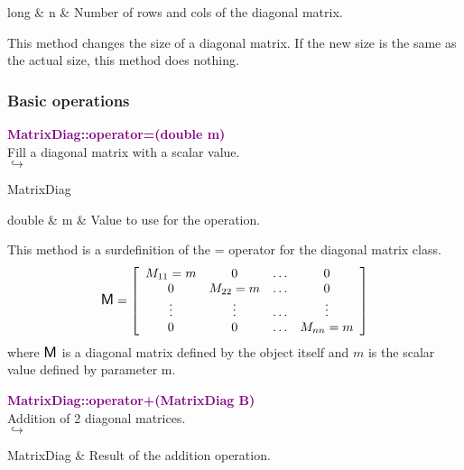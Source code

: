 \begin{tcolorbox}[width=\textwidth,myArgs,tabularx={ll|R}]
long & n & Number of rows and cols of the diagonal matrix.
\end{tcolorbox}

This method changes the size of a diagonal matrix.
If the new size is the same as the actual size, this method does nothing.

\subsubsection{Basic operations}


\textcolor{purple}{\textbf{MatrixDiag::operator=(double m)}}\label{MatrixDiag::operator=(double m)}\\
Fill a diagonal matrix with a scalar value.\\ \hspace*{5mm}$\hookrightarrow$
\vspace*{-2em}\begin{tcolorbox}[grow to left by=-1cm, width=\textwidth-1cm,myArgs,tabularx={l|R}]
MatrixDiag
\end{tcolorbox}

\begin{tcolorbox}[width=\textwidth,myArgs,tabularx={ll|R}]
double & m & Value to use for the operation.
\end{tcolorbox}

This method is a surdefinition of the = operator for the diagonal matrix class.
\begin{equation*}
\mbox{\large\ensuremath{\mathsf{M}}}=\left[\begin{array}{cccc}
  M_{11}=m & 0 & \hdots & 0\\
  0 & M_{22}=m & \hdots & 0\\
  \vdots & \vdots & \hdots & \vdots\\
  0 & 0 & \hdots & M_{nn}=m
  \end{array}\right]
\end{equation*}
where $\mbox{\large\ensuremath{\mathsf{M}}}$ is a diagonal matrix defined by the object itself and $m$ is the scalar value defined by parameter m.

\textcolor{purple}{\textbf{MatrixDiag::operator+(MatrixDiag B)}}\label{MatrixDiag::operator+(MatrixDiag B)}\\
Addition of 2 diagonal matrices.\\ \hspace*{5mm}$\hookrightarrow$
\vspace*{-2em}\begin{tcolorbox}[grow to left by=-1cm, width=\textwidth-1cm,myArgs,tabularx={l|R}]
MatrixDiag & Result of the addition operation.
\end{tcolorbox}

